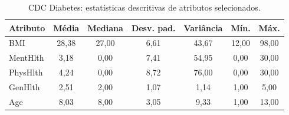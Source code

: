 \begin{table}[!t]
\centering
\caption{CDC Diabetes: estatísticas descritivas de atributos selecionados.}
\label{tab:cdc_estatisticas}
\begin{tabular}{lcccccc}
\hline
Atributo & Média & Mediana & Desv. pad. & Variância & Mín. & Máx. \\
\hline
BMI & 28,38 & 27,00 & 6,61 & 43,67 & 12,00 & 98,00 \\
MentHlth & 3,18 & 0,00 & 7,41 & 54,95 & 0,00 & 30,00 \\
PhysHlth & 4,24 & 0,00 & 8,72 & 76,00 & 0,00 & 30,00 \\
GenHlth & 2,51 & 2,00 & 1,07 & 1,14 & 1,00 & 5,00 \\
Age & 8,03 & 8,00 & 3,05 & 9,33 & 1,00 & 13,00 \\
\hline
\end{tabular}
\end{table}